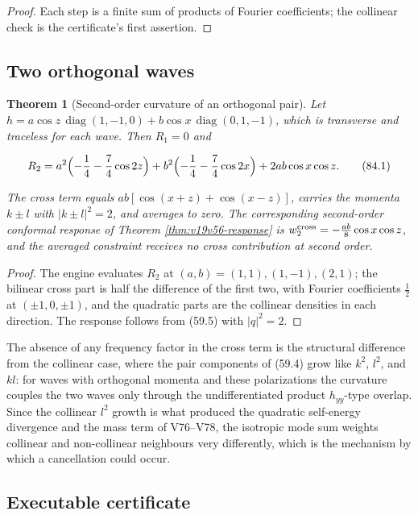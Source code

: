 \documentclass[11pt]{article}
\newtheorem{theorem}{Theorem}[section]
\theoremstyle{remark}
\begin{document}
\begin{proof}
Each step is a finite sum of products of Fourier coefficients; the
collinear check is the certificate's first assertion.
\end{proof}

\subsection{Two orthogonal waves}

\begin{theorem}[Second-order curvature of an orthogonal pair]
\label{thm:v19v81-pair}
Let \(h=a\cos z\,\operatorname{diag}(1,-1,0)+b\cos x\,\operatorname{diag}(0,1,-1)\),
which is transverse and traceless for each wave.  Then \(R_1=0\) and

\[
 R_2=a^2\Bigl(-\frac14-\frac74\cos2z\Bigr)+b^2\Bigl(-\frac14-\frac74\cos2x\Bigr)
 +2ab\cos x\cos z .                                                       \tag{84.1}
\]

The cross term equals \(ab[\cos(x+z)+\cos(x-z)]\), carries the momenta
\(k\pm l\) with \(|k\pm l|^2=2\), and averages to zero.  The
corresponding second-order conformal response of Theorem
\ref{thm:v19v56-response} is \(w_2^{\rm cross}=-\tfrac{ab}8\cos x\cos z\),
and the averaged constraint receives no cross contribution at second
order.
\end{theorem}

\begin{proof}
The engine evaluates \(R_2\) at \((a,b)=(1,1),(1,-1),(2,1)\); the
bilinear cross part is half the difference of the first two, with
Fourier coefficients \(\tfrac12\) at \((\pm1,0,\pm1)\), and the
quadratic parts are the collinear densities in each direction.  The
response follows from (59.5) with \(|q|^2=2\).
\end{proof}

The absence of any frequency factor in the cross term is the
structural difference from the collinear case, where the pair
components of (59.4) grow like \(k^2\), \(l^2\), and \(kl\): for waves
with orthogonal momenta and these polarizations the curvature
couples the two waves only through the undifferentiated product
\(h_{yy}\)-type overlap.  Since the collinear \(l^2\) growth is what
produced the quadratic self-energy divergence and the mass term of
V76--V78, the isotropic mode sum weights collinear and non-collinear
neighbours very differently, which is the mechanism by which a
cancellation could occur.

\subsection{Executable certificate}
\end{document}
